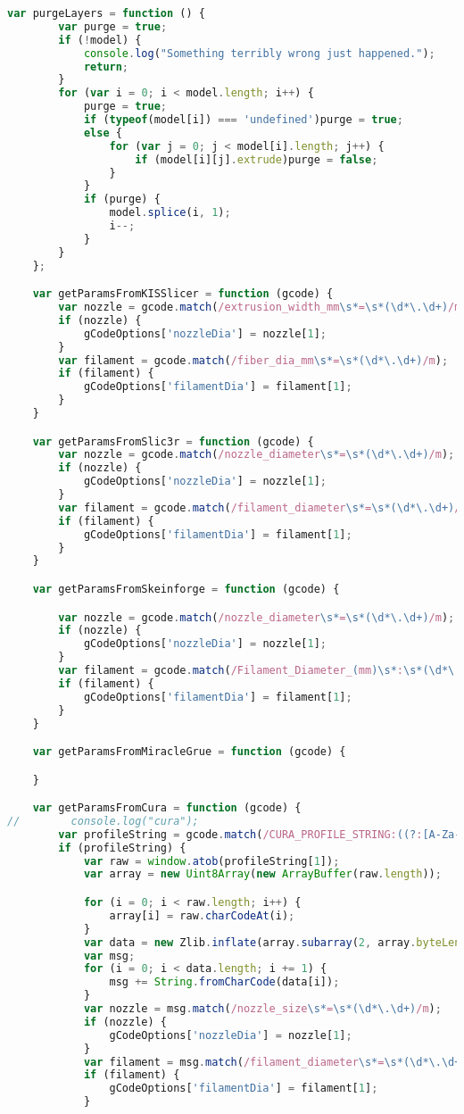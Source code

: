 \begin{lstlisting}[language=JavaScript, label={lst:gcodeFactory}, caption=gcodeFactory.js is the main gcode header parsing code.]
    var purgeLayers = function () {
        var purge = true;
        if (!model) {
            console.log("Something terribly wrong just happened.");
            return;
        }
        for (var i = 0; i < model.length; i++) {
            purge = true;
            if (typeof(model[i]) === 'undefined')purge = true;
            else {
                for (var j = 0; j < model[i].length; j++) {
                    if (model[i][j].extrude)purge = false;
                }
            }
            if (purge) {
                model.splice(i, 1);
                i--;
            }
        }
    };

    var getParamsFromKISSlicer = function (gcode) {
        var nozzle = gcode.match(/extrusion_width_mm\s*=\s*(\d*\.\d+)/m);
        if (nozzle) {
            gCodeOptions['nozzleDia'] = nozzle[1];
        }
        var filament = gcode.match(/fiber_dia_mm\s*=\s*(\d*\.\d+)/m);
        if (filament) {
            gCodeOptions['filamentDia'] = filament[1];
        }
    }

    var getParamsFromSlic3r = function (gcode) {
        var nozzle = gcode.match(/nozzle_diameter\s*=\s*(\d*\.\d+)/m);
        if (nozzle) {
            gCodeOptions['nozzleDia'] = nozzle[1];
        }
        var filament = gcode.match(/filament_diameter\s*=\s*(\d*\.\d+)/m);
        if (filament) {
            gCodeOptions['filamentDia'] = filament[1];
        }
    }

    var getParamsFromSkeinforge = function (gcode) {

        var nozzle = gcode.match(/nozzle_diameter\s*=\s*(\d*\.\d+)/m);
        if (nozzle) {
            gCodeOptions['nozzleDia'] = nozzle[1];
        }
        var filament = gcode.match(/Filament_Diameter_(mm)\s*:\s*(\d*\.\d+)/m);
        if (filament) {
            gCodeOptions['filamentDia'] = filament[1];
        }
    }

    var getParamsFromMiracleGrue = function (gcode) {

    }

    var getParamsFromCura = function (gcode) {
//        console.log("cura");
        var profileString = gcode.match(/CURA_PROFILE_STRING:((?:[A-Za-z0-9+/]{4})*(?:[A-Za-z0-9+/]{2}==|[A-Za-z0-9+/]{3}=|[A-Za-z0-9+/]{4}))/m);
        if (profileString) {
            var raw = window.atob(profileString[1]);
            var array = new Uint8Array(new ArrayBuffer(raw.length));

            for (i = 0; i < raw.length; i++) {
                array[i] = raw.charCodeAt(i);
            }
            var data = new Zlib.inflate(array.subarray(2, array.byteLength - 4));
            var msg;
            for (i = 0; i < data.length; i += 1) {
                msg += String.fromCharCode(data[i]);
            }
            var nozzle = msg.match(/nozzle_size\s*=\s*(\d*\.\d+)/m);
            if (nozzle) {
                gCodeOptions['nozzleDia'] = nozzle[1];
            }
            var filament = msg.match(/filament_diameter\s*=\s*(\d*\.\d+)/m);
            if (filament) {
                gCodeOptions['filamentDia'] = filament[1];
            }


\end{lstlisting}
